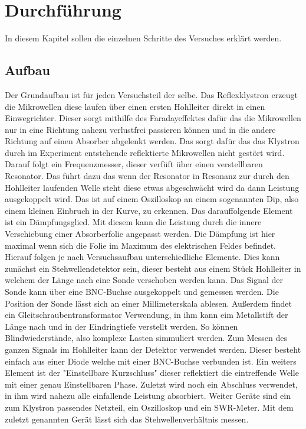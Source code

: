 \section{Durchführung}
\label{sec:Durchfuehrung}
In diesem Kapitel sollen die einzelnen Schritte des Versuches erklärt werden.

\subsection{Aufbau}
\label{sec:dfaufbau}
Der Grundaufbau ist für jeden Versuchsteil der selbe. Das Reflexklystron erzeugt die Mikrowellen
diese laufen über einen ersten Hohlleiter direkt in einen Einwegrichter. Dieser sorgt mithilfe des Faradayeffektes
dafür das die Mikrowellen nur in eine Richtung nahezu verlustfrei passieren können und in die andere Richtung 
auf einen Absorber abgelenkt werden. Das sorgt dafür das das Klystron durch im Experiment entstehende 
reflektierte Mikrowellen nicht gestört wird. Darauf folgt ein Frequenzmesser, dieser verfüft über einen 
verstellbaren Resonator. Das führt dazu das wenn der Resonator in Resonanz zur durch den Hohlleiter laufenden Welle
steht diese etwas abgeschwächt wird da dann Leistung ausgekoppelt wird. Das ist auf einem Oszilloskop an einem
sogenannten Dip, also einem kleinen Einbruch in der Kurve, zu erkennen. Das darauffolgende Element ist
ein Dämpfungsglied. Mit diesem kann die Leistung durch die innere Verschiebung einer Absorberfolie
angepasst werden. Die Dämpfung ist hier maximal wenn sich die Folie im Maximum des elektrischen Feldes 
befindet. Hierauf folgen je nach Versuchsaufbau unterschiedliche Elemente. Dies kann zunächst ein Stehwellendetektor
sein, dieser besteht aus einem Stück Hohlleiter in welchem der Länge nach eine Sonde verschoben werden kann. 
Das Signal der Sonde kann über eine BNC-Buchse ausgekoppelt und gemessen werden. Die Position der Sonde
lässt sich an einer Millimeterskala ablesen. Außerdem findet ein Gleitschraubentransformator Verwendung,
in ihm kann eim Metallstift der Länge nach und in der Eindringtiefe verstellt werden. So können
Blindwiederstände, also komplexe Lasten simmuliert werden. Zum Messen des ganzen Signals im Hohlleiter
kann der Detektor verwendet werden. Dieser besteht einfach aus einer Diode welche mit einer BNC-Buchse
verbunden ist. Ein weiters Element ist der "Einstellbare Kurzschluss" dieser 
reflektiert die eintreffende Welle mit einer genau Einstellbaren Phase. Zuletzt wird noch ein Abschluss
verwendet, in ihm wird nahezu alle einfallende Leistung absorbiert. Weiter Geräte sind ein zum Klystron passendes
Netzteil, ein Oszilloskop und ein SWR-Meter. Mit dem zuletzt genannten Gerät lässt sich das Stehwellenverhältnis
messen.

